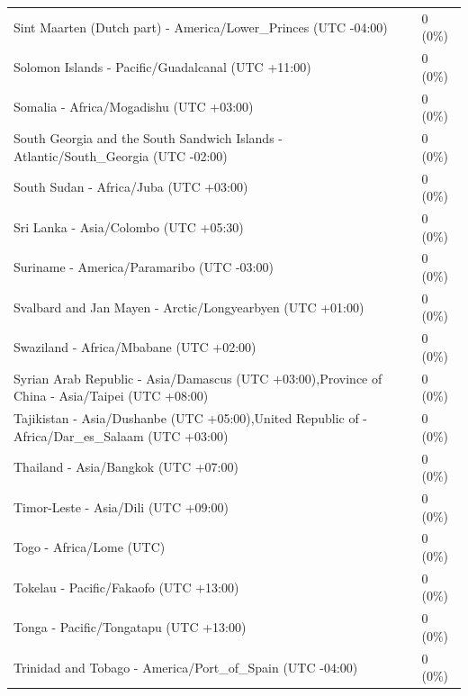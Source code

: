 \begin{appendix}
\begin{table}
{\begin{tabular}[t]{ll}
\hspace{1em}Sint Maarten (Dutch part) - America/Lower\_Princes (UTC -04:00) & 0 (0\%)\\
\hspace{1em}Solomon Islands - Pacific/Guadalcanal (UTC +11:00) & 0 (0\%)\\
\hspace{1em}Somalia - Africa/Mogadishu (UTC +03:00) & 0 (0\%)\\
\addlinespace
\hspace{1em}South Georgia and the South Sandwich Islands - Atlantic/South\_Georgia (UTC -02:00) & 0 (0\%)\\
\hspace{1em}South Sudan - Africa/Juba (UTC +03:00) & 0 (0\%)\\
\hspace{1em}Sri Lanka - Asia/Colombo (UTC +05:30) & 0 (0\%)\\
\hspace{1em}Suriname - America/Paramaribo (UTC -03:00) & 0 (0\%)\\
\hspace{1em}Svalbard and Jan Mayen - Arctic/Longyearbyen (UTC +01:00) & 0 (0\%)\\
\addlinespace
\hspace{1em}Swaziland - Africa/Mbabane (UTC +02:00) & 0 (0\%)\\
\hspace{1em}Syrian Arab Republic - Asia/Damascus (UTC +03:00),Province of China - Asia/Taipei (UTC +08:00) & 0 (0\%)\\
\hspace{1em}Tajikistan - Asia/Dushanbe (UTC +05:00),United Republic of - Africa/Dar\_es\_Salaam (UTC +03:00) & 0 (0\%)\\
\hspace{1em}Thailand - Asia/Bangkok (UTC +07:00) & 0 (0\%)\\
\hspace{1em}Timor-Leste - Asia/Dili (UTC +09:00) & 0 (0\%)\\
\addlinespace
\hspace{1em}Togo - Africa/Lome (UTC) & 0 (0\%)\\
\hspace{1em}Tokelau - Pacific/Fakaofo (UTC +13:00) & 0 (0\%)\\
\hspace{1em}Tonga - Pacific/Tongatapu (UTC +13:00) & 0 (0\%)\\
\hspace{1em}Trinidad and Tobago - America/Port\_of\_Spain (UTC -04:00) & 0 (0\%)\\

\end{tabular}}
\end{table}
\end{appendix}
